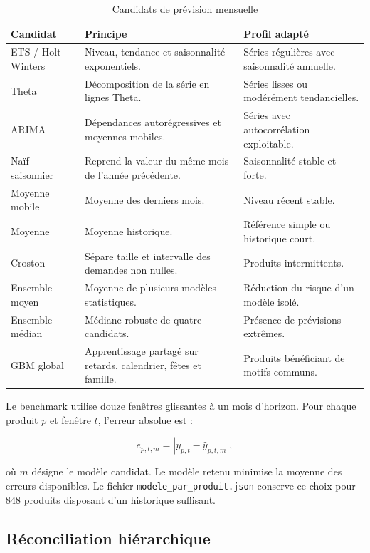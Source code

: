 \begin{table}[H]
\centering
\caption{Candidats de prévision mensuelle}
\label{tab:modeles}
\small
\begin{tabularx}{\textwidth}{p{3.1cm}Yp{4.2cm}}
\toprule
\textbf{Candidat} & \textbf{Principe} & \textbf{Profil adapté} \\
\midrule
ETS / Holt--Winters & Niveau, tendance et saisonnalité exponentiels. & Séries régulières avec saisonnalité annuelle. \\
Theta & Décomposition de la série en lignes Theta. & Séries lisses ou modérément tendancielles. \\
ARIMA & Dépendances autorégressives et moyennes mobiles. & Séries avec autocorrélation exploitable. \\
Naïf saisonnier & Reprend la valeur du même mois de l'année précédente. & Saisonnalité stable et forte. \\
Moyenne mobile & Moyenne des derniers mois. & Niveau récent stable. \\
Moyenne & Moyenne historique. & Référence simple ou historique court. \\
Croston & Sépare taille et intervalle des demandes non nulles. & Produits intermittents. \\
Ensemble moyen & Moyenne de plusieurs modèles statistiques. & Réduction du risque d'un modèle isolé. \\
Ensemble médian & Médiane robuste de quatre candidats. & Présence de prévisions extrêmes. \\
GBM global & Apprentissage partagé sur retards, calendrier, fêtes et famille. & Produits bénéficiant de motifs communs. \\
\bottomrule
\end{tabularx}
\end{table}

Le benchmark utilise douze fenêtres glissantes à un mois d'horizon. Pour chaque
produit $p$ et fenêtre $t$, l'erreur absolue est :

\begin{equation}
e_{p,t,m}=\left|y_{p,t}-\widehat{y}_{p,t,m}\right|,
\end{equation}

où $m$ désigne le modèle candidat. Le modèle retenu minimise la moyenne des
erreurs disponibles. Le fichier \texttt{modele\_par\_produit.json} conserve ce
choix pour 848 produits disposant d'un historique suffisant.

\subsection{Réconciliation hiérarchique}

